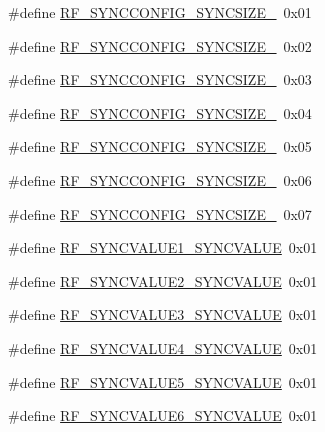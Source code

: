 \begin{DoxyCompactItemize}
\#define \mbox{\hyperlink{sx1276_regs-_fsk_8h_ab3cee473593e065fb7bb4121dba8dfc8}{R\+F\+\_\+\+S\+Y\+N\+C\+C\+O\+N\+F\+I\+G\+\_\+\+S\+Y\+N\+C\+S\+I\+Z\+E\+\_}}~0x01
\item 
\#define \mbox{\hyperlink{sx1276_regs-_fsk_8h_a0b7febf6601e6e048eadfea72756fbf5}{R\+F\+\_\+\+S\+Y\+N\+C\+C\+O\+N\+F\+I\+G\+\_\+\+S\+Y\+N\+C\+S\+I\+Z\+E\+\_}}~0x02
\item 
\#define \mbox{\hyperlink{sx1276_regs-_fsk_8h_a3e690add68a9524bb58f47842e68d83c}{R\+F\+\_\+\+S\+Y\+N\+C\+C\+O\+N\+F\+I\+G\+\_\+\+S\+Y\+N\+C\+S\+I\+Z\+E\+\_}}~0x03
\item 
\#define \mbox{\hyperlink{sx1276_regs-_fsk_8h_a604cc721857bae9b870b53048ecf341b}{R\+F\+\_\+\+S\+Y\+N\+C\+C\+O\+N\+F\+I\+G\+\_\+\+S\+Y\+N\+C\+S\+I\+Z\+E\+\_}}~0x04
\item 
\#define \mbox{\hyperlink{sx1276_regs-_fsk_8h_aff9f3662ee515712447db47565a8f7dc}{R\+F\+\_\+\+S\+Y\+N\+C\+C\+O\+N\+F\+I\+G\+\_\+\+S\+Y\+N\+C\+S\+I\+Z\+E\+\_}}~0x05
\item 
\#define \mbox{\hyperlink{sx1276_regs-_fsk_8h_a9d9db7e70160e306d46e9a3fb119497d}{R\+F\+\_\+\+S\+Y\+N\+C\+C\+O\+N\+F\+I\+G\+\_\+\+S\+Y\+N\+C\+S\+I\+Z\+E\+\_}}~0x06
\item 
\#define \mbox{\hyperlink{sx1276_regs-_fsk_8h_a3ad4c813c0827a01d61620f16a8e6867}{R\+F\+\_\+\+S\+Y\+N\+C\+C\+O\+N\+F\+I\+G\+\_\+\+S\+Y\+N\+C\+S\+I\+Z\+E\+\_}}~0x07
\item 
\#define \mbox{\hyperlink{sx1276_regs-_fsk_8h_a9dbf8a5e894ab724bb15b1721e218127}{R\+F\+\_\+\+S\+Y\+N\+C\+V\+A\+L\+U\+E1\+\_\+\+S\+Y\+N\+C\+V\+A\+L\+UE}}~0x01
\item 
\#define \mbox{\hyperlink{sx1276_regs-_fsk_8h_ab6518f99eb4a677a3fe535db8d48c732}{R\+F\+\_\+\+S\+Y\+N\+C\+V\+A\+L\+U\+E2\+\_\+\+S\+Y\+N\+C\+V\+A\+L\+UE}}~0x01
\item 
\#define \mbox{\hyperlink{sx1276_regs-_fsk_8h_aced5402e8dbb4d7795d00b115981f2f4}{R\+F\+\_\+\+S\+Y\+N\+C\+V\+A\+L\+U\+E3\+\_\+\+S\+Y\+N\+C\+V\+A\+L\+UE}}~0x01
\item 
\#define \mbox{\hyperlink{sx1276_regs-_fsk_8h_adf2d6af9d59e50370870d65071817b10}{R\+F\+\_\+\+S\+Y\+N\+C\+V\+A\+L\+U\+E4\+\_\+\+S\+Y\+N\+C\+V\+A\+L\+UE}}~0x01
\item 
\#define \mbox{\hyperlink{sx1276_regs-_fsk_8h_ae874599f8f93c33fc5c2bdc53602ebe5}{R\+F\+\_\+\+S\+Y\+N\+C\+V\+A\+L\+U\+E5\+\_\+\+S\+Y\+N\+C\+V\+A\+L\+UE}}~0x01
\item 
\#define \mbox{\hyperlink{sx1276_regs-_fsk_8h_ab94bee7a110ee04831e6a396a3d2a890}{R\+F\+\_\+\+S\+Y\+N\+C\+V\+A\+L\+U\+E6\+\_\+\+S\+Y\+N\+C\+V\+A\+L\+UE}}~0x01

\end{DoxyCompactItemize}
